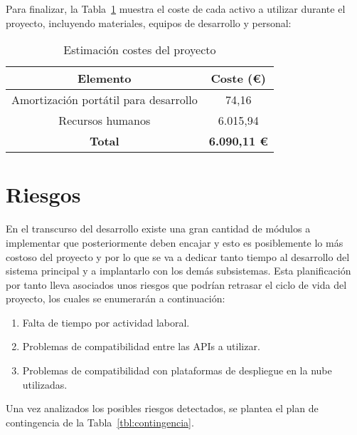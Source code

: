 Para finalizar, la Tabla~\ref{tbl:costes} muestra el coste de cada activo a utilizar durante el proyecto, incluyendo materiales, equipos de desarrollo y personal:
\begin{table}[h!tb]
\begin{adjustbox}{width=0.5\textwidth}
		\begin{tabular}{|c|c|}
			\hline \textbf{Elemento}
			& \textbf{Coste (\euro)} \\
			
			\hline Amortización portátil para desarrollo
			& 74,16  \\
			\hline Recursos humanos
			& 6.015,94 \\
			\hline \textbf{Total}
			& \textbf{6.090,11 \euro} \\
			\hline
		\end{tabular}
	\end{adjustbox}
	 \centering
	\caption{Estimación costes del proyecto}
	\label{tbl:costes}
\end{table}


\section{Riesgos}
En el transcurso del desarrollo existe una gran cantidad de módulos a implementar que posteriormente deben encajar y esto es posiblemente lo más costoso del proyecto y por lo que se va a dedicar tanto tiempo al desarrollo del sistema principal y a implantarlo con los demás subsistemas. Esta planificación por tanto lleva asociados unos riesgos que podrían retrasar el ciclo de vida del proyecto, los cuales se enumerarán a continuación:
\begin{enumerate}
	
	\item Falta de tiempo por actividad laboral.
	\item Problemas de compatibilidad entre las \glspl{API} a utilizar.
	\item Problemas de compatibilidad con plataformas de despliegue en la nube utilizadas.
	
\end{enumerate}

Una vez analizados los posibles riesgos detectados, se plantea el plan de contingencia de la Tabla~\ref{tbl:contingencia}.


